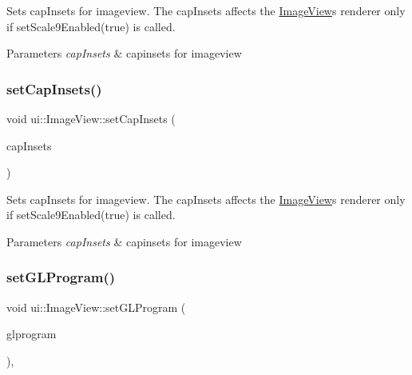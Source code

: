 Sets cap\+Insets for imageview. The cap\+Insets affects the \hyperlink{classui_1_1ImageView}{Image\+View}\textquotesingle{}s renderer only if {\ttfamily set\+Scale9\+Enabled(true)} is called.


\begin{DoxyParams}{Parameters}
{\em cap\+Insets} & capinsets for imageview \\
\hline
\end{DoxyParams}
\mbox{\label{classui_1_1ImageView_aaca6b6106d235cadd64a19cf2255f218}} 
\subsubsection{\texorpdfstring{set\+Cap\+Insets()}{setCapInsets()}\hspace{0.1cm}{\footnotesize\ttfamily [2/2]}}
{\footnotesize\ttfamily void ui\+::\+Image\+View\+::set\+Cap\+Insets (\begin{DoxyParamCaption}\item[{const \hyperlink{classRect}{Rect} \&}]{cap\+Insets }\end{DoxyParamCaption})}

Sets cap\+Insets for imageview. The cap\+Insets affects the \hyperlink{classui_1_1ImageView}{Image\+View}\textquotesingle{}s renderer only if {\ttfamily set\+Scale9\+Enabled(true)} is called.


\begin{DoxyParams}{Parameters}
{\em cap\+Insets} & capinsets for imageview \\
\hline
\end{DoxyParams}
\mbox{\label{classui_1_1ImageView_a98d9a45e777ea30849634eacf5b58509}} 
\subsubsection{\texorpdfstring{set\+G\+L\+Program()}{setGLProgram()}\hspace{0.1cm}{\footnotesize\ttfamily [1/2]}}
{\footnotesize\ttfamily void ui\+::\+Image\+View\+::set\+G\+L\+Program (\begin{DoxyParamCaption}\item[{\hyperlink{classGLProgram}{G\+L\+Program} $\ast$}]{glprogram }\end{DoxyParamCaption})\hspace{0.3cm}{\ttfamily [override]}, {\ttfamily [virtual]}}

